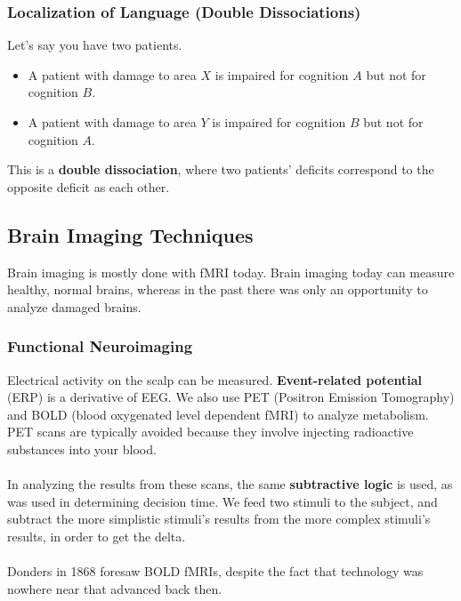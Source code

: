\documentclass[]{article}
\begin{document}
			\subsubsection{Localization of Language (Double Dissociations)}
				Let's say you have two patients.
				\begin{itemize}
					\item A patient with damage to area $X$ is impaired for cognition $A$ but not for cognition $B$.
					\item A patient with damage to area $Y$ is impaired for cognition $B$ but not for cognition $A$.
				\end{itemize}

				This is a \textbf{double dissociation}, where two patients' deficits correspond to the opposite deficit as each other.
		
		\subsection{Brain Imaging Techniques}
			Brain imaging is mostly done with fMRI today. Brain imaging today can measure healthy, normal brains, whereas in the past there was only an opportunity to analyze damaged brains.
			\subsubsection{Functional Neuroimaging}
				Electrical activity on the scalp can be measured. \textbf{Event-related potential} (ERP) is a derivative of EEG. We also use PET (Positron Emission Tomography) and BOLD (blood oxygenated level dependent fMRI) to analyze metabolism. PET scans are typically avoided because they involve injecting radioactive substances into your blood.
				\\ \\
				In analyzing the results from these scans, the same \textbf{subtractive logic} is used, as was used in determining decision time. We feed two stimuli to the subject, and subtract the more simplistic stimuli's results from the more complex stimuli's results, in order to get the delta.
				\\ \\
				Donders in 1868 foresaw BOLD fMRIs, despite the fact that technology was nowhere near that advanced back then.
\end{document}
